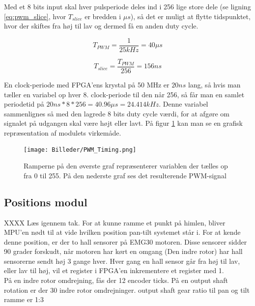 Med et 8 bits input skal hver pulsperiode deles ind i 256 lige store dele (se ligning \ref{eq:pwm_slice}, hvor $T_{slice}$ er bredden i $\mu s$), så det er muligt at flytte tidspunktet, hvor der skiftes fra høj til lav og dermed få en anden duty cycle. 

\begin{equation}\label{eq:pwm_period}
T_{PWM}=\dfrac{1}{25 kHz} = 40 \mu s
\end{equation}

\begin{equation}\label{eq:pwm_slice}
T_{slice}=\dfrac{T_{PWM}}{256}=156ns
\end{equation}

En clock-periode med FPGA'ens krystal på 50 MHz er $20ns$ lang, så hvis man tæller en variabel op hver 8. clock-periode til den når 256, så får man en samlet periodetid på $20ns*8*256=40.96 \mu s=24.414kHz$. Denne variabel sammenlignes så med den lagrede 8 bits duty cycle værdi, for at afgøre om signalet på udgangen skal være højt eller lavt. På figur \ref{fig:PWM_timing} kan man se en grafisk repræsentation af modulets virkemåde.

\begin{figure}[ht]
	\begin{center}
		\texttt{[image: Billeder/PWM\_Timing.png]}
	\end{center}
\caption{Ramperne på den øverste graf repræsenterer variablen der tælles op fra 0 til 255. På den nederste graf ses det resulterende PWM-signal}
\label{fig:PWM_timing}
\end{figure}

\subsection{Positions modul}
XXXX Læs igennem tak.
For at kunne ramme et punkt på himlen, bliver MPU'en nødt til at vide hvilken position pan-tilt systemet står i.
For at kende denne position, er der to hall sensorer på EMG30 motoren.
Disse sensorer sidder 90 grader forskudt, når motoren har kørt en omgang (Den indre rotor) har hall sensorerne sendt høj 3 gange hver.
Hver gang en hall sensor går fra høj til lav, eller lav til høj, vil et register i FPGA'en inkrementere et register med 1.\\

På en indre rotor omdrejning, fås der 12 encoder ticks.
På en output shaft rotation er der 30 indre rotor omdrejninger.
output shaft gear ratio til pan og tilt ramme er 1:3

